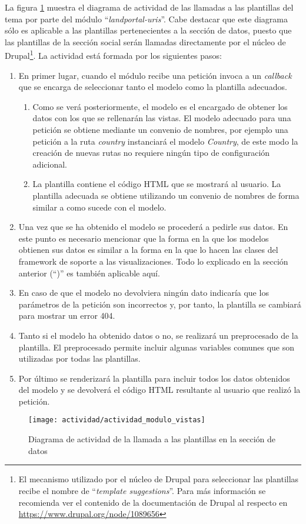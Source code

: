 La figura \ref{fig:diagrama_actividad_vistas} muestra el diagrama de actividad de las llamadas a las plantillas del tema por parte del módulo ``\textit{landportal-uris}''.  Cabe destacar que este diagrama sólo es aplicable a las plantillas pertenecientes a la sección de datos, puesto que las plantillas de la sección social serán llamadas directamente por el núcleo de Drupal\footnote{El mecanismo utilizado por el núcleo de Drupal para seleccionar las plantillas recibe el nombre de ``\textit{template suggestions}''.  Para más información se recomienda ver el contenido de la documentación de Drupal al respecto en \url{https://www.drupal.org/node/1089656}}.  La actividad está formada por los siguientes pasos:
\begin{enumerate}
	\item  En primer lugar, cuando el módulo recibe una petición invoca a un \textit{callback} que se encarga de seleccionar tanto el modelo como la plantilla adecuados.
		\begin{enumerate}
			\item  Como se verá posteriormente, el modelo es el encargado de obtener los datos con los que se rellenarán las vistas.  El modelo adecuado para una petición se obtiene mediante un convenio de nombres, por ejemplo una petición a la ruta \textit{country} instanciará el modelo \textit{Country}, de este modo la creación de nuevas rutas no requiere ningún tipo de configuración adicional.
			\item  La plantilla contiene el código HTML que se mostrará al usuario.  La plantilla adecuada se obtiene utilizando un convenio de nombres de forma similar a como sucede con el modelo.
		\end{enumerate}
	\item  Una vez que se ha obtenido el modelo se procederá a pedirle sus datos.  En este punto es necesario mencionar que la forma en la que los modelos obtienen sus datos es similar a la forma en la que lo hacen las clases del framework de soporte a las visualizaciones.  Todo lo explicado en la sección anterior (``)'' es también aplicable aquí.
	\item  En caso de que el modelo no devolviera ningún dato indicaría que los parámetros de la petición son incorrectos y, por tanto, la plantilla se cambiará para mostrar un error 404.
	\item  Tanto si el modelo ha obtenido datos o no, se realizará un preprocesado de la plantilla.  El preprocesado permite incluir algunas variables comunes que son utilizadas por todas las plantillas.
	\item  Por último se renderizará la plantilla para incluir todos los datos obtenidos del modelo y se devolverá el código HTML resultante al usuario que realizó la petición.
\end{enumerate}

\begin{figure}[h]
	\centering
	\texttt{[image: actividad/actividad\_modulo\_vistas]}
	\caption{Diagrama de actividad de la llamada a las plantillas en la sección de datos}
	\label{fig:diagrama_actividad_vistas}
\end{figure}